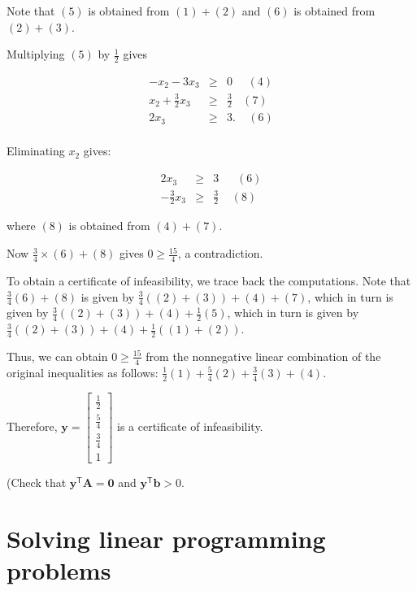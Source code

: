 \documentclass[]{book}
\def\gt{>}
\newcommand{\mm}[1]{\mathbf{#1}}
\renewcommand{\vec}[1]{\mathbf{#1}}
\theoremstyle{definition}
\theoremstyle{definition}
\theoremstyle{remark}
\begin{document}
\begin{enumerate}
  Note that \((5)\) is obtained from \((1) + (2)\) and \((6)\) is
  obtained from \((2) + (3)\).

  Multiplying \((5)\) by \(\frac{1}{2}\) gives

  \begin{eqnarray*}
  -x_2 - 3x_3 & \geq & 0~~~~~~(4) \\
  x_2 + \frac{3}{2}x_3& \geq & \frac{3}{2}~~~~(7) \\
  2x_3  & \geq & 3.~~~~~(6) \\
  \end{eqnarray*}

  Eliminating \(x_2\) gives:

  \begin{eqnarray*}
  2x_3  & \geq & 3~~~~~~~(6) \\
  - \frac{3}{2} x_3 & \geq & \frac{3}{2}~~~~~(8)
  \end{eqnarray*}

  where \((8)\) is obtained from \((4) + (7)\).

  Now \(\frac{3}{4}\times (6) + (8)\) gives \(0 \geq \frac{15}{4}\), a
  contradiction.

  To obtain a certificate of infeasibility, we trace back the
  computations. Note that \(\frac{3}{4} (6) + (8)\) is given by
  \(\frac{3}{4} ((2)+(3)) + (4)+ (7)\), which in turn is given by
  \(\frac{3}{4} ((2)+(3)) + (4)+ \frac{1}{2}(5)\), which in turn is
  given by \(\frac{3}{4} ((2)+(3)) + (4)+ \frac{1}{2}((1) + (2))\).

  Thus, we can obtain \(0 \geq \frac{15}{4}\) from the nonnegative
  linear combination of the original inequalities as follows:
  \(\frac{1}{2} (1) + \frac{5}{4} (2) + \frac{3}{4} (3) + (4)\).

  Therefore,
  \(\vec{y} = \begin{bmatrix} \frac{1}{2} \\ \frac{5}{4} \\ \frac{3}{4} \\ 1\end{bmatrix}\)
  is a certificate of infeasibility.

  (Check that \(\vec{y}^\mathsf{T}\mm{A} = \vec{0}\) and
  \(\vec{y}^\mathsf{T} \vec{b} \gt 0\).
\end{enumerate}

\chapter{Solving linear programming problems}\label{fund-lp}
\end{document}
